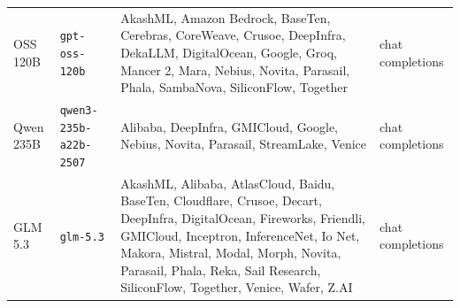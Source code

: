 \begin{longtable}{@{}l >{\raggedright\arraybackslash}p{} >{\raggedright\arraybackslash}p{} l@{}}
OSS 120B & \texttt{gpt-oss-120b} & AkashML, Amazon Bedrock, BaseTen, Cerebras, CoreWeave, Crusoe, DeepInfra, DekaLLM, DigitalOcean, Google, Groq, Mancer 2, Mara, Nebius, Novita, Parasail, Phala, SambaNova, SiliconFlow, Together & chat completions \\
Qwen 235B & \texttt{qwen3-235b-a22b-2507} & Alibaba, DeepInfra, GMICloud, Google, Nebius, Novita, Parasail, StreamLake, Venice & chat completions \\
GLM 5.3 & \texttt{glm-5.3} & AkashML, Alibaba, AtlasCloud, Baidu, BaseTen, Cloudflare, Crusoe, Decart, DeepInfra, DigitalOcean, Fireworks, Friendli, GMICloud, Inceptron, InferenceNet, Io Net, Makora, Mistral, Modal, Morph, Novita, Parasail, Phala, Reka, Sail Research, SiliconFlow, Together, Venice, Wafer, Z.AI & chat completions \\
\end{longtable}
